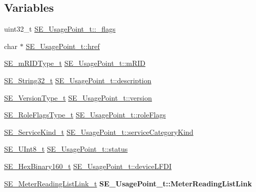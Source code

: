 \subsection*{Variables}
\begin{DoxyCompactItemize}
\item 
uint32\+\_\+t \hyperlink{group__UsagePoint_ga22a1651a84bc960921ca4bd34c078437}{S\+E\+\_\+\+Usage\+Point\+\_\+t\+::\+\_\+flags}
\item 
char $\ast$ \hyperlink{group__UsagePoint_ga43021172f7da501245b4e72b80ee5e75}{S\+E\+\_\+\+Usage\+Point\+\_\+t\+::href}
\item 
\hyperlink{group__mRIDType_gac74622112f3a388a2851b2289963ba5e}{S\+E\+\_\+m\+R\+I\+D\+Type\+\_\+t} \hyperlink{group__UsagePoint_ga645e59a2bd1f4d5685d14e5df4176b16}{S\+E\+\_\+\+Usage\+Point\+\_\+t\+::m\+R\+ID}
\item 
\hyperlink{group__String32_gac9f59b06b168b4d2e0d45ed41699af42}{S\+E\+\_\+\+String32\+\_\+t} \hyperlink{group__UsagePoint_ga6ab8b16a8dde1f19d28423dc07615af8}{S\+E\+\_\+\+Usage\+Point\+\_\+t\+::description}
\item 
\hyperlink{group__VersionType_ga4b8d27838226948397ed99f67d46e2ae}{S\+E\+\_\+\+Version\+Type\+\_\+t} \hyperlink{group__UsagePoint_gaebce20c6df39c9a81d141f4ec08c5b50}{S\+E\+\_\+\+Usage\+Point\+\_\+t\+::version}
\item 
\hyperlink{group__RoleFlagsType_gac20b70bba5dd7d6773b13d69c372c957}{S\+E\+\_\+\+Role\+Flags\+Type\+\_\+t} \hyperlink{group__UsagePoint_gaa7a0bde02ead6c247119e2e009da01fd}{S\+E\+\_\+\+Usage\+Point\+\_\+t\+::role\+Flags}
\item 
\hyperlink{group__ServiceKind_ga19a788255c7eeda579474fc6f3cc0810}{S\+E\+\_\+\+Service\+Kind\+\_\+t} \hyperlink{group__UsagePoint_ga5d3e64f099c6fee8452abdfa1fce6cb2}{S\+E\+\_\+\+Usage\+Point\+\_\+t\+::service\+Category\+Kind}
\item 
\hyperlink{group__UInt8_gaf7c365a1acfe204e3a67c16ed44572f5}{S\+E\+\_\+\+U\+Int8\+\_\+t} \hyperlink{group__UsagePoint_gad92c2e2bb45df1e0967e40cfb59d1454}{S\+E\+\_\+\+Usage\+Point\+\_\+t\+::status}
\item 
\hyperlink{group__HexBinary160_ga92b92aa55555bdb75f3a59060f2c1632}{S\+E\+\_\+\+Hex\+Binary160\+\_\+t} \hyperlink{group__UsagePoint_gafb00c05d7c38ea87e94b837d5712ac0b}{S\+E\+\_\+\+Usage\+Point\+\_\+t\+::device\+L\+F\+DI}
\item 
\mbox{\label{group__UsagePoint_gaad2b6862dd3f2ba4d3da7c8f61f0a64f}} 
\hyperlink{structSE__MeterReadingListLink__t}{S\+E\+\_\+\+Meter\+Reading\+List\+Link\+\_\+t} {\bfseries S\+E\+\_\+\+Usage\+Point\+\_\+t\+::\+Meter\+Reading\+List\+Link}
\end{DoxyCompactItemize}


